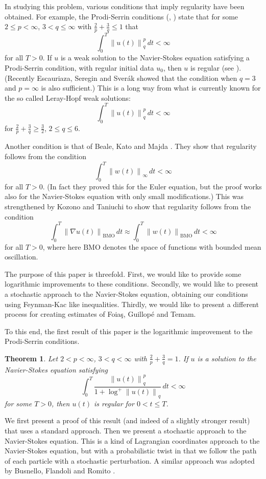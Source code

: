 \documentclass[12pt]{amsart}
\newtheorem{thm}{Theorem}[section]
\theoremstyle{remark}
\newcommand{\snormo}[1]{{\mathopen\|#1\mathclose\|}}
\newcommand{\BMO}{\mathrm{BMO}}
\begin{document}
In studying this problem, various conditions that imply regularity
have been obtained.  For example, the 
Prodi-Serrin conditions (\cite{prodi}, \cite{serrin})
state that for some
$2 \le p < \infty$, $3<q\le\infty$ with
$\frac2p + \frac 3q \le 1$ that
$$ \int_0^T \snormo{u(t)}_q^p \, dt < \infty $$
for all $T>0$.
If $u$ is
a weak solution to the Navier-Stokes equation 
satisfying a Prodi-Serrin condition,
with regular initial
data $u_0$, then $u$ is regular (see \cite{sohr}).
(Recently Escauriaza, Seregin and Sver\'ak \cite{escauriaza et al}
showed that the condition when $q=3$ and $p=\infty$ is also sufficient.)
This is a long way from what is currently known for the so called Leray-Hopf 
weak
solutions:
$$ \int_0^T \snormo{u(t)}_q^p \, dt < \infty $$
for $\frac2p + \frac 3q \ge \frac32$, $2 \le q \le 6$.

Another condition is that of Beale, Kato and Majda
\cite{beale-kato-majda}.  They show that regularity
follows from the condition
$$ \int_0^T \snormo{w(t)}_\infty \, dt < \infty $$
for all $T > 0$.
(In fact they proved this for the Euler equation, but the
proof works also for the Navier-Stokes equation with only small modifications.)
This was strengthened by Kozono and Taniuchi 
\cite{kozono-taniuchi} to show that regularity follows
from the condition
$$ \int_0^T \snormo{\nabla u(t)}_\BMO \, dt \approx
   \int_0^T \snormo{w(t)}_\BMO \, dt < \infty $$
for all $T > 0$, where here $\BMO$ denotes the space of functions with bounded
mean oscillation.

The purpose of this paper is threefold.  First, we would like to provide some
logarithmic improvements to these conditions.  Secondly, we would like to
present a stochastic approach to the Navier-Stokes equation, obtaining
our conditions using Feynman-Kac like inequalities.  Thirdly, we would like
to present a different process for creating 
estimates of
Foia\c s, Guillop\'e and Temam.

To this end, the first result of this paper is the logarithmic improvement
to the Prodi-Serrin conditions.

\begin{thm} \label{main prodi-serrin}
Let 
$2 < p < \infty$, $3<q < \infty$ with
$\frac2p+\frac3q=1$.
If $u$ is a solution to the Navier-Stokes equation satisfying
$$ \int_0^T \frac{\snormo{u(t)}_q^p}{1+\log^+\snormo{u(t)}_q}
   \, dt < \infty $$
for some $T>0$, 
then $u(t)$ 
is regular for $0 < t\le T$.
\end{thm}

We first present a proof of this result (and indeed of
a slightly stronger result) that uses a standard approach.  
Then 
we present a stochastic approach to the Navier-Stokes equation.
This is a kind of Lagrangian coordinates approach to the
Navier-Stokes equation, but with a probabilistic twist in that we follow
the path of each particle with a stochastic perturbation.  A similar approach
was adopted by Busnello, Flandoli and Romito \cite{busnello et al}.
\end{document}
